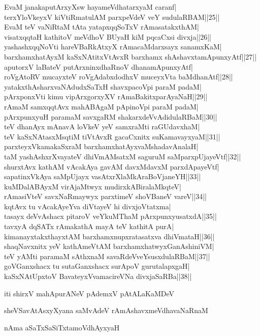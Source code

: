 \documentclass{article}
\begin{document}
EvaM janakaputArxyXsw hayameVdhatarxyaM caranf|\\
terxYloVkeyxV kiVtiRmatulAM parxpeVdeV veY sudulaRBAM||25||\\
EvaM teV vaNiRtaM tAta yatapxqqSoTxV rAmasatakxthAM|\\
visatxqqtaH kathitoV meVdhoV BUyaH kiM pqcaCxsi divxja||26||\\
yashashxqqNoVti hareVBaRkAtxyX rAmacaMdarxsayx sanamxKaM|\\
barxhamxhatAyxM kaSxNAtitxVtAvxR barxhamx shAshavxtamApunxyAtf||27||\\
aputorxV laBateV putArxninxdhaRnoV dhanamApunxyAtf|\\
roVgAtoRV mucayxteV roVgAdabxdodhxV muceyxVta baMdhanAtf||28||\\
yatakxthAsharxvaNAdudxSaTxH shavxpacoVpi paraM padaM|\\
pArxponxVti kimu vipArxgorxyXV rAmaBakitxparAyaNaH||29||\\
rAmaM samxqqtAvx mahABAgaM pApinoVpi paraM padaM|\\
pArxpunxyuH paramaM savxgaRM shakarxdeVvAdidulaRBaM||30||\\
teV dhanAyx mAnavA loVkeV yeV samxraMti raGUdavxhaM|\\
teV kaSxNAtasxMsqtiM tiVtAvxR gacaCxnitx suKamavayxyaM||31||\\
parxteyxVkamakaSxraM barxhamxhatAyxvaMshadavAnalaH|\\
taM yashAshxrXvayateV dhiVmAMsatxM saguruM saMparxpUjayeVtf||32||\\
shurxtAvx kathAM vAcakAya gavAM davxMdavxM parxdApayeVtf|\\
sapatinxVkAya saMpUjayx vasAtxrXlaMkAraBoVjaneYH||33||\\
kuMDalABAyxM virAjaMtwyx mudirxkABiralaMkqteV|\\
rAmasiVteV savxNaRmaywyx parxtimeV shoVBaneV vareV||34||\\
kqtAvx tu vAcakAyeYva diVtayeV hi divxjoVtatxma|\\
tasayx deVvAshacx pitaroV veYkuMThaM pArxpunxyusatxdA||35||\\
tavxyA dqSATx rAmakathA mayA teV kathitA purA|\\
kimanayxtakxthayxtAM barxhamxnupxratasatxva dhiVmataH||36||\\
shaqNavxnitx yeV kathAmeVtAM barxhamxhatwyxGanAshiniVM|\\
teV yAMti paramaM sAthxnaM savaRdeVveYsusxdulaRBaM||37||\\
goVGanxshacx tu sutaGanxshacx surApoV gurutalapxgaH|\\
kaSxNAtUpxtoV BavateyxVvamacireVNa divxjaSaRBa||38||\\

\begin{center}
iti shirxV mahApurANeV pAdemxV pAtALaKaMDeV
\end{center}

\begin{center}
sheVSavAtAsxyXyana saMvAdeV rAmAshavxmeVdhavaNaRnaM
\end{center}

\begin{center}
nAma aSaTxSaSiTxtamoVdhAyxyaH
\end{center}
\end{document}
